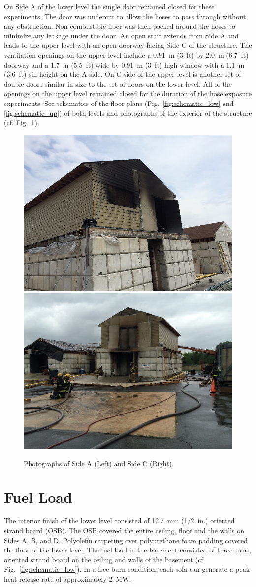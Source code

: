 \documentclass[letterpaper,11pt]{texMemo} %
\begin{document}
On Side A of the lower level the single door remained closed for these experiments. The door was undercut to allow the hoses to pass through without any obstruction. Non-combustible fiber was then packed around the hoses to minimize any leakage under the door.  An open stair extends from Side A and leads to the upper level with an open doorway facing Side C of the structure. The ventilation openings on the upper level include a 0.91~m (3~ft) by 2.0~m (6.7~ft) doorway and a 1.7~m (5.5~ft) wide by 0.91~m (3~ft) high window with a 1.1~m (3.6~ft) sill height on the A side. On C side of the upper level is another set of double doors similar in size to the set of doors on the lower level. All of the openings on the upper level remained closed for the duration of the hose exposure experiments. See schematics of the floor plans (Fig.~\ref{fig:schematic_low} and \ref{fig:schematic_up}) of both levels and photographs of the exterior of the structure (cf. Fig.~\ref{fig:exterior}).

\begin{figure}[!ht]
\centering
\includegraphics[width=0.45\columnwidth]{../Figures/Hose_Figures/exterior_a}
\includegraphics[width=0.45\columnwidth,trim = 1.25in 1.5in .75in 0in, clip=true,]{../Figures/Hose_Figures/exterior_c}
\caption{Photographs of Side A (Left) and Side C (Right). }
\label{fig:exterior}
\end{figure}

\section{Fuel Load}
The interior finish of the lower level consisted of 12.7~mm (1/2~in.) oriented strand board (OSB).  The OSB covered the entire ceiling, floor and the walls on Sides A, B, and D. Polyolefin carpeting over polyurethane foam padding covered the floor of the lower level.  The fuel load in the basement consisted of three sofas, oriented strand board on the ceiling and walls of the basement (cf. Fig.~\ref{fig:schematic_low}).  In a free burn condition, each sofa can generate a peak heat release rate of approximately 2~MW.
\end{document}
